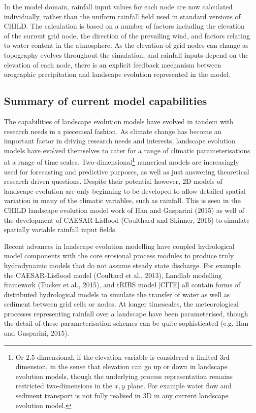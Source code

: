 \documentclass[12pt,oneside,PhD]{muthesis}
\begin{document}
In the model domain, rainfall input values for each node are now calculated individually, rather than the uniform rainfall field used in standard versions of CHILD. The calculation is based on a number of factors including the elevation of the current grid node, the direction of the prevailing wind, and factors relating to water content in the atmosphere. As the elevation of grid nodes can change as topography evolves throughout the simulation, and rainfall inputs depend on the elevation of each node, there is an explicit feedback mechanism between orographic precipitation and landscape evolution represented in the model. 

\subsection{Summary of current model capabilities}

The capabilities of landscape evolution models have evolved in tandem with research needs in a piecemeal fashion. As climate change has become an important factor in driving research needs and interests, landscape evolution models have evolved themselves to cater for a range of climatic parameterisations at a range of time scales. Two-dimensional\footnote{Or 2.5-dimensional, if the elevation variable is considered a limited 3rd dimension, in the sense that elevation can go up or down in landscape evolution models, though the underlying process representation remains restricted two-dimensions in the \(x,y\) plane. For example water flow and sediment transport is not fully realised in 3D in any current landscape evolution model.} numerical models are increasingly used for forecasting and predictive purposes, as well as just answering theoretical research driven questions. Despite their potential however, 2D models of landscape evolution are only beginning to be developed to allow detailed spatial variation in many of the climatic variables, such as rainfall. This is seen in the CHILD landscape evolution model work of Han and Gasparini (2015) as well of the development of CAESAR-Lisflood (Coulthard and Skinner, 2016) to simulate spatially variable rainfall input fields. 

Recent advances in landscape evolution modelling have coupled hydrological model components with the core erosional process modules to produce truly hydrodynamic models that do not assume steady state discharge. For example the CAESAR-Lisflood model (Coultard et al., 2013), Landlab modelling framework (Tucker et al., 2015), and tRIBS model [CITE] all contain forms of distributed hydrological models to simulate the transfer of water as well as sediment between grid cells or nodes. At longer timescales, the meteorological processes representing rainfall over a landscape have been parameterised, though the detail of these parameterisation schemes can be quite sophisticated (e.g. Han and Gasparini, 2015).
\end{document}
